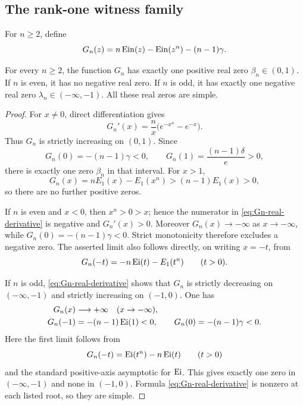 \subsection{The rank-one witness family}

For \(n\ge2\), define
\begin{equation}\label{eq:Gn-witness-family}
 G_n(z)=n\operatorname{Ein}(z)-\operatorname{Ein}(z^n)-(n-1)\gamma.
\end{equation}

\begin{proposition}
\label{prop:Gn-real-zero-classification}
For every \(n\ge2\), the function \(G_n\) has exactly one positive real zero
\(\beta_n\in(0,1)\).  If \(n\) is even, it has no negative real zero.  If
\(n\) is odd, it has exactly one negative real zero
\(\lambda_n\in(-\infty,-1)\).  All these real zeros are simple.
\end{proposition}

\begin{proof}
For \(x\ne0\), direct differentiation gives
\begin{equation}\label{eq:Gn-real-derivative}
 G_n'(x)=\frac n{x}\bigl(e^{-x^n}-e^{-x}\bigr).
\end{equation}
Thus \(G_n\) is strictly increasing on \((0,1)\).  Since
\[
 G_n(0)=-(n-1)\gamma<0,
 \qquad
 G_n(1)=\frac{(n-1)\delta}{e}>0,
\]
there is exactly one zero \(\beta_n\) in that interval.  For \(x>1\),
\[
 G_n(x)=nE_1(x)-E_1(x^n)>(n-1)E_1(x)>0,
\]
so there are no further positive zeros.

If \(n\) is even and \(x<0\), then \(x^n>0>x\); hence the numerator in
\eqref{eq:Gn-real-derivative} is negative and \(G_n'(x)>0\).  Moreover
\(G_n(x)\to-\infty\) as \(x\to-\infty\), while
\(G_n(0)=-(n-1)\gamma<0\).  Strict monotonicity therefore excludes a
negative zero.  The asserted limit also follows directly, on writing
\(x=-t\), from
\[
 G_n(-t)=-n\operatorname{Ei}(t)-E_1(t^n)\qquad(t>0).
\]

If \(n\) is odd, \eqref{eq:Gn-real-derivative} shows that \(G_n\) is
strictly decreasing on \((-\infty,-1)\) and strictly increasing on
\((-1,0)\).  One has
 \begin{align*}
 G_n(x)&\longrightarrow+\infty\quad(x\to-\infty),\\
 G_n(-1)&=-(n-1)\operatorname{Ei}(1)<0,\qquad
 G_n(0)=-(n-1)\gamma<0.
 \end{align*}
Here the first limit follows from
\[
 G_n(-t)=\operatorname{Ei}(t^n)-n\operatorname{Ei}(t)\qquad(t>0)
\]
and the standard positive-axis asymptotic for \(\operatorname{Ei}\).
This gives exactly one zero in \((-\infty,-1)\) and none in \((-1,0)\).
Formula \eqref{eq:Gn-real-derivative} is nonzero at each listed root, so
they are simple.
\end{proof}

